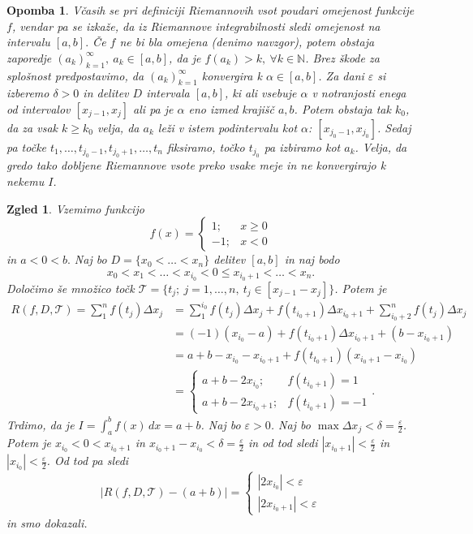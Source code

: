 \documentclass[10pt, a4paper]{article}
\newtheorem*{opomba}{Opomba}
\newtheorem{zgled}{Zgled}[section]
\newcommand{\N}{\mathbb {N}}
\begin{document}
\begin{opomba}
    Včasih se pri definiciji Riemannovih vsot poudari omejenost funkcije $f$, vendar pa se izkaže, da iz Riemannove integrabilnosti sledi omejenost na intervalu $[a, b].$
    Če $f$ ne bi bla omejena (denimo navzgor), potem obstaja zaporedje $(a_k)_{k = 1} ^{\infty},\ a_k \in [a, b]$, da je $f(a_k) > k,\ \forall k \in \N$.
    Brez škode za splošnost predpostavimo, da $(a_k)_{k = 1} ^{\infty}$ konvergira k $\alpha \in [a, b]$.
    Za dani $\varepsilon$ si izberemo $\delta > 0$ in delitev $D$ intervala $[a, b]$, ki ali vsebuje $\alpha$ v notranjosti enega od intervalov $[x_{j-1}, x_j]$ ali pa je $\alpha$ eno izmed krajišč $a, b$.
    Potem obstaja tak $k_0$, da za vsak $k \geq k_0$ velja, da $a_k$ leži v istem podintervalu kot $\alpha$: $[x_{j_0 -1}, x_{j_0}]$.
    Sedaj pa točke $t_1, \dots, t_{j_0 - 1}, t_{j_0 + 1}, \dots, t_{n}$ fiksiramo, točko $t_{j_0}$ pa izbiramo kot $a_k$. 
    Velja, da gredo tako dobljene Riemannove vsote preko vsake meje in ne konvergirajo k nekemu $I$.
\end{opomba}

\begin{zgled}
    Vzemimo funkcijo $$f(x) = \begin{cases}
        1 ;& x \geq 0\\
        -1 ;& x < 0
    \end{cases}$$ in $a < 0 < b.$ 
    Naj bo $D = \{x_0 < \dots < x_n\}$ delitev $[a, b]$ in naj bodo
    $$x_0 < x_1 < \dots < x_{i_0} < 0 \leq x_{i_0 +1} < \dots < x_n.$$
    Določimo še množico točk $\mathcal{T} = \{t_j;\ j = 1, \dots, n,\ t_j \in [x_{j-1} - x_j]\}$.
    Potem je 
    \begin{align*}
        R(f, D, \mathcal{T}) = \sum_1 ^n f(t_j) \Delta x_j
        &= \sum_1 ^{i_0} f(t_j) \Delta x_j + f(t_{i_0 +1}) \Delta x_{i_0 + 1} + \sum_{i_0 + 2} ^n f(t_j) \Delta x_j\\
        &= (-1) (x_{i_0} - a) + f(t_{i_0 + 1}) \Delta x_{i_0 + 1} + (b - x_{i_0 + 1})\\
        &= a+b -x_{i_0} - x_{i_0 + 1} + f(t_{t_0 + 1}) (x_{i_0 + 1} - x_{i_0})\\
        &= \begin{cases}
            a+ b - 2 x_{i_0} ;& f(t_{i_0 + 1}) = 1\\
            a +b - 2 x_{i_0 + 1} ;& f(t_{i_0 + 1}) = -1
        \end{cases}.
    \end{align*}
    Trdimo, da je $I = \int_a ^b f(x)\,dx = a + b$.
    Naj bo $\varepsilon > 0$. Naj bo $\max \Delta x_j < \delta = \frac{\varepsilon}{2}$.
    Potem je $x_{i_0} < 0 < x_{i_0 + 1}$ in $x_{i_0 +1} - x_{i_0} < \delta = \frac{\varepsilon}{2}$ in od tod sledi $|x_{i_0 + 1}| < \frac{\varepsilon}{2}$ in $|x_{i_0}| < \frac{\varepsilon}{2}$.
    Od tod pa sledi $$|R(f, D, \mathcal{T}) - (a+b)| = \begin{cases}
        |2 x_{i_0}| < \varepsilon\\
        |2 x_{i_0 + 1}| < \varepsilon
    \end{cases}$$ in smo dokazali.
\end{zgled}
\end{document}
